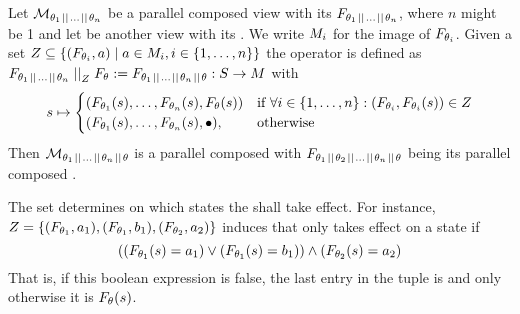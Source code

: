 \documentclass[preview]{standalone}
\begin{document}
\begin{definition}
	Let $\view[\viewppty_1 \pll \dots \pll 
	\viewppty_n]$ be a parallel composed view with its \grpfctN $\grpfct[{\viewppty_1 \pll \dots \pll \viewppty_n}]$, where $n$ might be 1 and let \view be another view with its \grpfctN \grpfct. We write $\imggrp_i$ for the image of $\grpfct[\viewppty_i]$.
	Given a set $\compselectset \subseteq \{ (\grpfct[\viewppty_i], a) \mid a \in \imggrp_i, i \in \{1, \dots, n\}\}$ the operator \compselectpure is defined as $\grpfct[{\viewppty_1 \pll \dots \pll \viewppty_n}] \compselect \grpfct := \grpfct[{\viewppty_1 \pll \dots \pll \viewppty_n} \pll \viewppty]: \states \to \arbset$ with
	\[
	\state \mapsto
	\begin{cases}
		(\grpfct[\viewppty_1](\state), \dots, \grpfct[\viewppty_n](\state),  \grpfct[\viewppty](\state))				& \text{if } \forall i \in \{1, \dots, n\} : (\grpfct[\viewppty_i], \grpfct[\viewppty_i](\state)) \in \compselectset \\ 		
		(\grpfct[\viewppty_1](\state), \dots, \grpfct[\viewppty_n](\state),  \remelem),          	& \text{otherwise}
	\end{cases}
	\]
\noindent
Then $\view[\viewppty_1 \pll \dots \pll 
\viewppty_n \pll \viewppty]$ is a parallel composed \viewN with $\grpfct[{\viewppty_1 \pll \viewppty_2 \pll \dots \pll \viewppty_n} \pll \viewppty]$ being its parallel composed \grpfctN.
\label{def:compositionselective}
\end{definition}
The set \compselectset determines on which states the \viewN \view shall take effect. For instance, $\compselectset = \{(\grpfct[\viewppty_1], a_1),(\grpfct[\viewppty_1], b_1), (\grpfct[\viewppty_2], a_2)\}$ induces that \view only takes effect on a state \state if 
\[
((\grpfct[\viewppty_1](\state) = a_1) \lor (\grpfct[\viewppty_1](\state) = b_1)) \land (\grpfct[\viewppty_2](\state) = a_2)
\]
That is, if this boolean expression is false, the last entry in the tuple is \remelem and only otherwise it is $\grpfct(\state)$.
\end{document}
